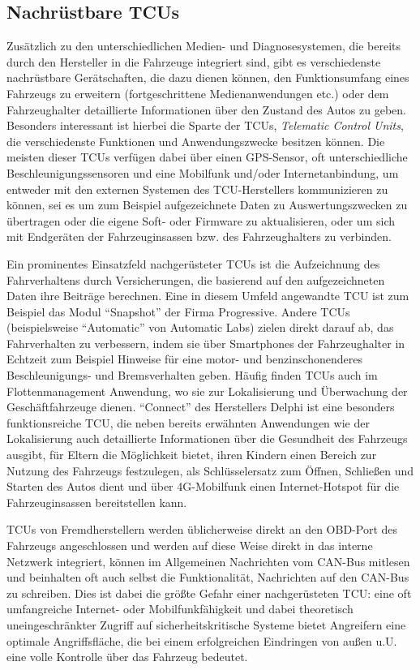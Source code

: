 \documentclass[
    fontsize=12pt,
    headings=small,
    parskip=half,           %
    bibliography=totoc,
    numbers=noenddot,       %
    open=any,               %
    ]{scrreprt}
\begin{document}
\subsection{Nachrüstbare TCUs}
Zusätzlich zu den unterschiedlichen Medien- und Diagnosesystemen, die bereits durch den Hersteller in die Fahrzeuge integriert sind, gibt es verschiedenste nachrüstbare Gerätschaften, die dazu dienen können, den Funktionsumfang eines Fahrzeugs zu erweitern (fortgeschrittene Medienanwendungen etc.) oder dem Fahrzeughalter detaillierte Informationen über den Zustand des Autos zu geben. Besonders interessant ist hierbei die Sparte der TCUs, \textit{Telematic Control Units}, die verschiedenste Funktionen und Anwendungszwecke besitzen können. Die meisten dieser TCUs verfügen dabei über einen GPS-Sensor, oft unterschiedliche Beschleunigungssensoren und eine Mobilfunk und/oder Internetanbindung, um entweder mit den externen Systemen des TCU-Herstellers kommunizieren zu können, sei es um zum Beispiel aufgezeichnete Daten zu Auswertungszwecken zu übertragen oder die eigene Soft- oder Firmware zu aktualisieren, oder um sich mit Endgeräten der Fahrzeuginsassen bzw. des Fahrzeughalters zu verbinden. \par
Ein prominentes Einsatzfeld nachgerüsteter TCUs ist die Aufzeichnung des Fahrverhaltens durch Versicherungen, die basierend auf den aufgezeichneten Daten ihre Beiträge berechnen. Eine in diesem Umfeld angewandte TCU ist zum Beispiel das Modul "`Snapshot"' der Firma Progressive. Andere TCUs (beispielsweise "`Automatic"' von Automatic Labs) zielen direkt darauf ab, das Fahrverhalten zu verbessern, indem sie über Smartphones der Fahrzeughalter in Echtzeit zum Beispiel Hinweise für eine motor- und benzinschonenderes Beschleunigungs- und Bremsverhalten geben. Häufig finden TCUs auch im Flottenmanagement Anwendung, wo sie zur Lokalisierung und Überwachung der Geschäftfahrzeuge dienen. "`Connect"' des Herstellers Delphi ist eine besonders funktionsreiche TCU, die neben bereits erwähnten Anwendungen wie der Lokalisierung auch detaillierte Informationen über die Gesundheit des Fahrzeugs ausgibt, für Eltern die Möglichkeit bietet, ihren Kindern einen Bereich zur Nutzung des Fahrzeugs festzulegen, als Schlüsselersatz zum Öffnen, Schließen und Starten des Autos dient und über 4G-Mobilfunk einen Internet-Hotspot für die Fahrzeuginsassen bereitstellen kann. \par
TCUs von Fremdherstellern werden üblicherweise direkt an den OBD-Port des Fahrzeugs angeschlossen und werden auf diese Weise direkt in das interne Netzwerk integriert, können im Allgemeinen Nachrichten vom CAN-Bus mitlesen und beinhalten oft auch selbst die Funktionalität, Nachrichten auf den CAN-Bus zu schreiben. Dies ist dabei die größte Gefahr einer nachgerüsteten TCU: eine oft umfangreiche Internet- oder Mobilfunkfähigkeit und dabei theoretisch uneingeschränkter Zugriff auf sicherheitskritische Systeme bietet Angreifern eine optimale Angriffsfläche, die bei einem erfolgreichen Eindringen von außen u.U. eine volle Kontrolle über das Fahrzeug bedeutet. \par
\end{document}
